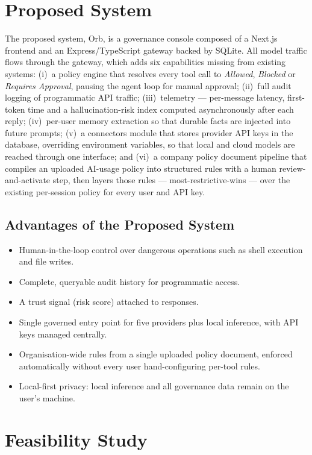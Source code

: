 \documentclass[12pt,a4paper,oneside]{report}
\begin{document}
\section{Proposed System}
The proposed system, Orb, is a governance console composed of a
Next.js frontend and an Express/TypeScript gateway backed by SQLite.
All model traffic flows through the gateway, which adds six
capabilities missing from existing systems: (i)~a policy engine that
resolves every tool call to \emph{Allowed}, \emph{Blocked} or
\emph{Requires Approval}, pausing the agent loop for manual approval;
(ii)~full audit logging of programmatic API traffic; (iii)~telemetry
--- per-message latency, first-token time and a hallucination-risk
index computed asynchronously after each reply; (iv)~per-user memory
extraction so that durable facts are injected into future prompts;
(v)~a connectors module that stores provider API keys in the
database, overriding environment variables, so that local and cloud
models are reached through one interface; and (vi)~a company policy
document pipeline that compiles an uploaded AI-usage policy into
structured rules with a human review-and-activate step, then layers
those rules --- most-restrictive-wins --- over the existing per-session
policy for every user and API key.

\subsection{Advantages of the Proposed System}
\begin{itemize}
  \item Human-in-the-loop control over dangerous operations such as
        shell execution and file writes.
  \item Complete, queryable audit history for programmatic access.
  \item A trust signal (risk score) attached to responses.
  \item Single governed entry point for five providers plus local
        inference, with API keys managed centrally.
  \item Organisation-wide rules from a single uploaded policy document,
        enforced automatically without every user hand-configuring
        per-tool rules.
  \item Local-first privacy: local inference and all governance data
        remain on the user's machine.
\end{itemize}

\section{Feasibility Study}
\end{document}
